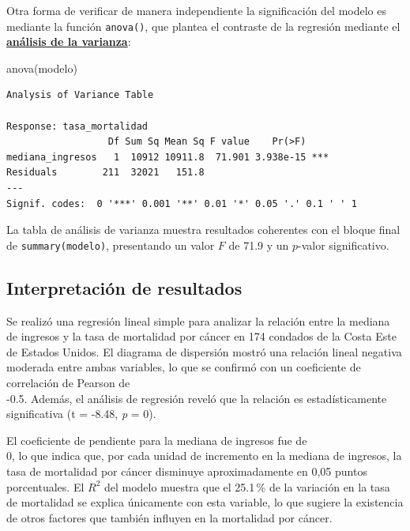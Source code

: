 \documentclass[
  spanish,
  a4paper,
]{scrbook}
\newenvironment{Shaded}{\begin{snugshade}}{\end{snugshade}}
\newcommand{\FunctionTok}[1]{\textcolor[rgb]{0.28,0.35,0.67}{#1}}
\newcommand{\NormalTok}[1]{\textcolor[rgb]{0.00,0.23,0.31}{#1}}
\begin{document}
Otra forma de verificar de manera independiente la significación del
modelo es mediante la función \texttt{anova()}, que plantea el contraste
de la regresión mediante el \href{05_anova.qmd}{\textbf{análisis de la
varianza}}:

\begin{Shaded}
\begin{Highlighting}[]
\FunctionTok{anova}\NormalTok{(modelo)}
\end{Highlighting}
\end{Shaded}

\begin{verbatim}
Analysis of Variance Table

Response: tasa_mortalidad
                  Df Sum Sq Mean Sq F value    Pr(>F)    
mediana_ingresos   1  10912 10911.8  71.901 3.938e-15 ***
Residuals        211  32021   151.8                      
---
Signif. codes:  0 '***' 0.001 '**' 0.01 '*' 0.05 '.' 0.1 ' ' 1
\end{verbatim}

La tabla de análisis de varianza muestra resultados coherentes con el
bloque final de \texttt{summary(modelo)}, presentando un valor \(F\) de
71.9 y un \(p\)-valor significativo.

\subsection{Interpretación de
resultados}\label{interpretaciuxf3n-de-resultados}

Se realizó una regresión lineal simple para analizar la relación entre
la mediana de ingresos y la tasa de mortalidad por cáncer en 174
condados de la Costa Este de Estados Unidos. El diagrama de dispersión
mostró una relación lineal negativa moderada entre ambas variables, lo
que se confirmó con un coeficiente de correlación de Pearson de\\
-0.5. Además, el análisis de regresión reveló que la relación es
estadísticamente significativa (t = -8.48, \emph{p} = 0).

El coeficiente de pendiente para la mediana de ingresos fue de\\
0, lo que indica que, por cada unidad de incremento en la mediana de
ingresos, la tasa de mortalidad por cáncer disminuye aproximadamente en
0,05 puntos porcentuales. El \(R^2\) del modelo muestra que el 25.1\,\%
de la variación en la tasa de mortalidad se explica únicamente con esta
variable, lo que sugiere la existencia de otros factores que también
influyen en la mortalidad por cáncer.
\end{document}
